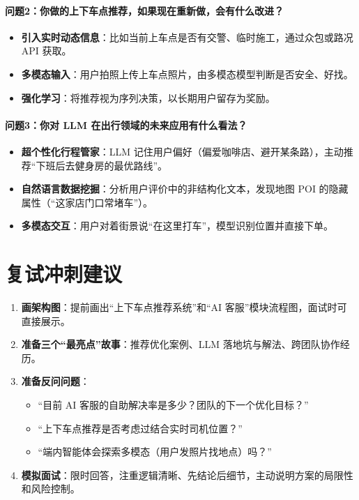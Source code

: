 \documentclass[12pt,a4paper]{article}
\begin{document}
\paragraph{问题2：你做的上下车点推荐，如果现在重新做，会有什么改进？}
\begin{itemize}
\item \textbf{引入实时动态信息}：比如当前上车点是否有交警、临时施工，通过众包或路况 API 获取。
\item \textbf{多模态输入}：用户拍照上传上车点照片，由多模态模型判断是否安全、好找。
\item \textbf{强化学习}：将推荐视为序列决策，以长期用户留存为奖励。
\end{itemize}

\paragraph{问题3：你对 LLM 在出行领域的未来应用有什么看法？}
\begin{itemize}
\item \textbf{超个性化行程管家}：LLM 记住用户偏好（偏爱咖啡店、避开某条路），主动推荐“下班后去健身房的最优路线”。
\item \textbf{自然语言数据挖掘}：分析用户评价中的非结构化文本，发现地图 POI 的隐藏属性（“这家店门口常堵车”）。
\item \textbf{多模态交互}：用户对着街景说“在这里打车”，模型识别位置并直接下单。
\end{itemize}

\section{复试冲刺建议}

\begin{enumerate}
\item \textbf{画架构图}：提前画出“上下车点推荐系统”和“AI 客服”模块流程图，面试时可直接展示。
\item \textbf{准备三个“最亮点”故事}：推荐优化案例、LLM 落地坑与解法、跨团队协作经历。
\item \textbf{准备反问问题}：
\begin{itemize}
  \item “目前 AI 客服的自助解决率是多少？团队的下一个优化目标？”
  \item “上下车点推荐是否考虑过结合实时司机位置？”
  \item “端内智能体会探索多模态（用户发照片找地点）吗？”
\end{itemize}
\item \textbf{模拟面试}：限时回答，注重逻辑清晰、先结论后细节，主动说明方案的局限性和风险控制。
\end{enumerate}
\end{document}
